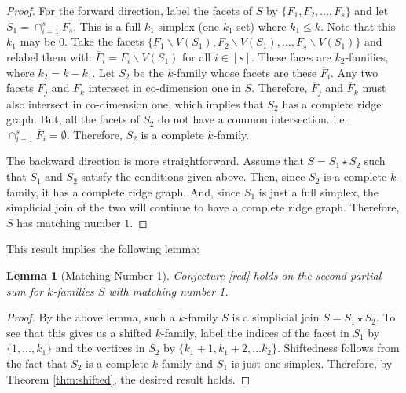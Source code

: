 \documentclass[11pt]{article}
\newtheorem{lm}{Lemma}
\begin{document}
\begin{proof}
For the forward direction, label the facets of $S$ by $\{F_1, F_2, \ldots, F_s\}$ and let $S_1 = \cap_{i = 1}^s F_s$. This is a full $k_1$-simplex (one $k_1$-set) where $k_1 \leq k$. Note that this $k_1$ may be 0. Take the facets $\{F_1 \backslash V(S_1), F_2 \backslash V(S_1), \ldots, F_s \backslash V(S_1)\}$ and relabel them with $\overline{F}_i = F_i \backslash V(S_1)$ for all $i \in [s]$. These faces are $k_2$-families, where $k_2 = k - k_1$. Let $S_2$ be the $k$-family whose facets are these $\overline{F}_i$. Any two facets $F_j$ and $F_k$ intersect in co-dimension one in $S$. Therefore, $\overline{F}_j$ and $\overline{F}_k$ must also intersect in co-dimension one, which implies that $S_2$ has a complete ridge graph. But, all the facets of $S_2$ do not have a common intersection. i.e., $\cap_{i = 1}^s \overline{F}_i = \emptyset.$ Therefore, $S_2$ is a complete $k$-family.



The backward direction is more straightforward. Assume that $S = S_1 \star S_2$ such that $S_1$ and $S_2$ satisfy the conditions given above. Then, since $S_2$ is a complete $k$-family, it has a complete ridge graph. And, since $S_1$ is just a full simplex, the simplicial join of the two will continue to have a complete ridge graph. Therefore, $S$ has matching number $1$.
\end{proof}


This result implies the following lemma:


\begin{lm}[Matching Number 1]
Conjecture \ref{red} holds on the second partial sum for $k$-families $S$ with matching number 1.
\end{lm}

\begin{proof}
By the above lemma, such a $k$-family $S$ is a simplicial join $S = S_1 \star S_2$. To see that this gives us a shifted $k$-family, label the indices of the facet in $S_1$ by $\{1, \ldots, k_1\}$ and the vertices in $S_2$ by $\{k_1 + 1, k_1+2, \ldots k_2\}$. Shiftedness follows from the fact that $S_2$ is a complete $k$-family and $S_1$ is just one simplex. Therefore, by Theorem \ref{thm:shifted}, the desired result holds.
\end{proof}
\end{document}
